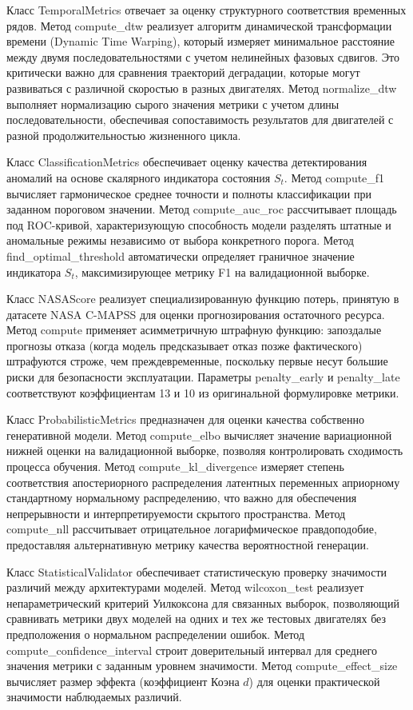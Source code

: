 \documentclass[14pt, a4paper, oneside]{extreport}
\begin{document}
Класс {TemporalMetrics} отвечает за оценку структурного соответствия временных рядов. Метод {compute\_dtw} реализует алгоритм динамической трансформации времени (Dynamic Time Warping), который измеряет минимальное расстояние между двумя последовательностями с учетом нелинейных фазовых сдвигов. Это критически важно для сравнения траекторий деградации, которые могут развиваться с различной скоростью в разных двигателях. Метод {normalize\_dtw} выполняет нормализацию сырого значения метрики с учетом длины последовательности, обеспечивая сопоставимость результатов для двигателей с разной продолжительностью жизненного цикла.

Класс {ClassificationMetrics} обеспечивает оценку качества детектирования аномалий на основе скалярного индикатора состояния $S_t$. Метод {compute\_f1} вычисляет гармоническое среднее точности и полноты классификации при заданном пороговом значении. Метод {compute\_auc\_roc} рассчитывает площадь под ROC-кривой, характеризующую способность модели разделять штатные и аномальные режимы независимо от выбора конкретного порога. Метод {find\_optimal\_threshold} автоматически определяет граничное значение индикатора $S_t$, максимизирующее метрику F1 на валидационной выборке.

Класс {NASAScore} реализует специализированную функцию потерь, принятую в датасете NASA C-MAPSS для оценки прогнозирования остаточного ресурса. Метод {compute} применяет асимметричную штрафную функцию: запоздалые прогнозы отказа (когда модель предсказывает отказ позже фактического) штрафуются строже, чем преждевременные, поскольку первые несут большие риски для безопасности эксплуатации. Параметры {penalty\_early} и {penalty\_late} соответствуют коэффициентам 13 и 10 из оригинальной формулировке метрики.

Класс {ProbabilisticMetrics} предназначен для оценки качества собственно генеративной модели. Метод {compute\_elbo} вычисляет значение вариационной нижней оценки на валидационной выборке, позволяя контролировать сходимость процесса обучения. Метод {compute\_kl\_divergence} измеряет степень соответствия апостериорного распределения латентных переменных априорному стандартному нормальному распределению, что важно для обеспечения непрерывности и интерпретируемости скрытого пространства. Метод {compute\_nll} рассчитывает отрицательное логарифмическое правдоподобие, предоставляя альтернативную метрику качества вероятностной генерации.

Класс {StatisticalValidator} обеспечивает статистическую проверку значимости различий между архитектурами моделей. Метод {wilcoxon\_test} реализует непараметрический критерий Уилкоксона для связанных выборок, позволяющий сравнивать метрики двух моделей на одних и тех же тестовых двигателях без предположения о нормальном распределении ошибок. Метод {compute\_confidence\_interval} строит доверительный интервал для среднего значения метрики с заданным уровнем значимости. Метод {compute\_effect\_size} вычисляет размер эффекта (коэффициент Коэна $d$) для оценки практической значимости наблюдаемых различий.
\end{document}
